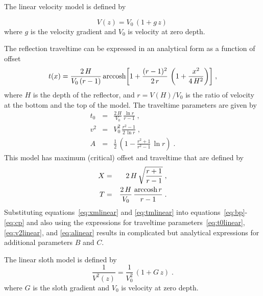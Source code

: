 
The linear velocity model is defined by 

\begin{equation}
\label{eq:linear}
V(z) = V_0\,(1+g\,z)\,
\end{equation}
where $g$ is the velocity gradient and $V_0$ is velocity at zero depth.

The reflection traveltime can be expressed in an analytical form as a
function of offset \cite[]{LSC00-00-02680268}
\begin{equation}
  t(x) = {\frac{2\,H}{V_0\,(r-1)}}\,
  {\mbox{arccosh}{\left[1 + \frac{(r-1)^2}{2\,r}\,\left(1+\frac{x^2}{4\,H^2}\right)\right]}}\;,
  \label{eq:tlinear}
\end{equation}
where $H$ is the depth of the reflector, and $r=V(H)/V_0$ is
the ratio of velocity at the bottom and the top of the model. The
traveltime parameters are given by
\begin{eqnarray}
  \label{eq:t0linear}
  t_0 & = & \frac{2\,H}{V_0}\,\frac{\ln{r}}{r-1}\;, \\
  \label{eq:v2linear}
  v^2 & = & V_0^2\,\frac{r^2-1}{2\,\ln{r}}\;, \\
  \label{eq:alinear}
  A & = & \frac{1}{2}\,\left(1-\frac{r^2+1}{r^2-1}\,\ln{r}\right)\;.
\end{eqnarray}
This model has maximum (critical) offset and traveltime that are
defined by
\begin{eqnarray}
  \label{eq:xmlinear}
  X & = & 2\,H\,\sqrt{\frac{r+1}{r-1}}\;, \\
  \label{eq:tmlinear}
  T & = & \frac{2\,H}{V_0}\,\frac{\mbox{arccosh}\,{r}}{r-1}\;.
\end{eqnarray}
Substituting equations~\ref{eq:xmlinear} and \ref{eq:tmlinear} into
equations~\ref{eq:bp}-\ref{eq:cp} and also using the expressions for
traveltime parameters~\ref{eq:t0linear}, \ref{eq:v2linear}, and
\ref{eq:alinear} results in complicated but analytical expressions for
additional parameters $B$ and $C$.


The linear sloth model is defined by 
\begin{equation}
  {\frac{1}{V^2(z)}} = {\frac{1}{V_0^2}}\,(1+G\,z)\;.
  \label{eq:sloth}
\end{equation}
where $G$ is the sloth gradient and $V_0$ is velocity at zero depth.

